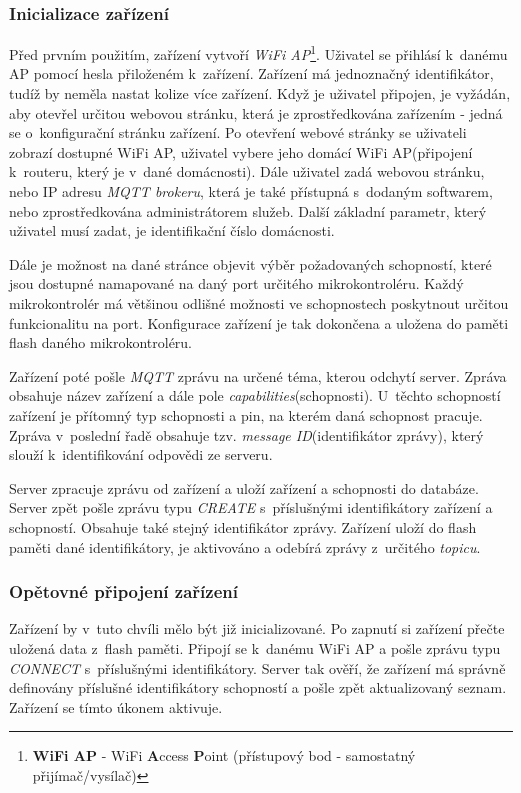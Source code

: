 \subsubsection*{Inicializace zařízení}
Před prvním použitím, zařízení vytvoří \emph{WiFi AP}\footnote{\textbf{WiFi AP} - WiFi \textbf{A}ccess \textbf{P}oint (přístupový bod - samostatný přijímač/vysílač)}.
Uživatel se přihlásí k~danému AP pomocí hesla přiloženém k~zařízení. Zařízení má jednoznačný identifikátor, tudíž by neměla nastat kolize více zařízení.
Když je uživatel připojen, je vyžádán, aby otevřel určitou webovou stránku, která je zprostředkována zařízením - jedná se o~konfigurační stránku zařízení.
Po otevření webové stránky se uživateli zobrazí dostupné WiFi AP, uživatel vybere jeho domácí WiFi AP(připojení k~routeru, který je v~dané domácnosti).
Dále uživatel zadá webovou stránku, nebo IP adresu \emph{MQTT brokeru}, která je také přístupná s~dodaným softwarem, nebo zprostředkována administrátorem služeb.
Další základní parametr, který uživatel musí zadat, je identifikační číslo domácnosti.

Dále je možnost na dané stránce objevit výběr požadovaných schopností, které jsou dostupné namapované na daný port určitého mikrokontroléru.
Každý mikrokontrolér má většinou odlišné možnosti ve schopnostech poskytnout určitou funkcionalitu na port.
Konfigurace zařízení je tak dokončena a uložena do paměti flash daného mikrokontroléru.

Zařízení poté pošle \emph{MQTT} zprávu na určené téma, kterou odchytí server. Zpráva obsahuje název zařízení a dále pole \emph{capabilities}(schopnosti).
U~těchto schopností zařízení je přítomný typ schopnosti a pin, na kterém daná schopnost pracuje.
Zpráva v~poslední řadě obsahuje tzv. \emph{message ID}(identifikátor zprávy), který slouží k~identifikování odpovědi ze serveru.

Server zpracuje zprávu od zařízení a uloží zařízení a schopnosti do databáze.
Server zpět pošle zprávu typu \emph{CREATE} s~příslušnými identifikátory zařízení a schopností.
Obsahuje také stejný identifikátor zprávy.
Zařízení uloží do flash paměti dané identifikátory, je aktivováno a odebírá zprávy z~určitého \emph{topicu}.

\subsubsection*{Opětovné připojení zařízení}
Zařízení by v~tuto chvíli mělo být již inicializované.
Po zapnutí si zařízení přečte uložená data z~flash paměti.
Připojí se k~danému WiFi AP a pošle zprávu typu \emph{CONNECT} s~příslušnými identifikátory.
Server tak ověří, že zařízení má správně definovány příslušné identifikátory schopností a pošle zpět aktualizovaný seznam.
Zařízení se tímto úkonem aktivuje.

